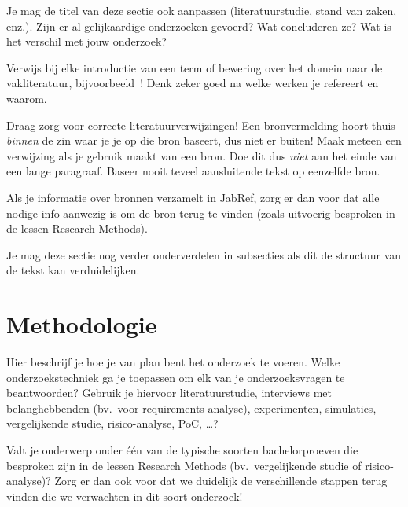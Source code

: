 Je mag de titel van deze sectie ook aanpassen (literatuurstudie, stand van zaken, enz.). Zijn er al gelijkaardige onderzoeken gevoerd? Wat concluderen ze? Wat is het verschil met jouw onderzoek?

Verwijs bij elke introductie van een term of bewering over het domein naar de vakliteratuur, bijvoorbeeld~\autocite{Hykes2013}! Denk zeker goed na welke werken je refereert en waarom.

Draag zorg voor correcte literatuurverwijzingen! Een bronvermelding hoort thuis \emph{binnen} de zin waar je je op die bron baseert, dus niet er buiten! Maak meteen een verwijzing als je gebruik maakt van een bron. Doe dit dus \emph{niet} aan het einde van een lange paragraaf. Baseer nooit teveel aansluitende tekst op eenzelfde bron.

Als je informatie over bronnen verzamelt in JabRef, zorg er dan voor dat alle nodige info aanwezig is om de bron terug te vinden (zoals uitvoerig besproken in de lessen Research Methods).


Je mag deze sectie nog verder onderverdelen in subsecties als dit de structuur van de tekst kan verduidelijken.

\section{Methodologie}%
\label{sec:methodologie}

Hier beschrijf je hoe je van plan bent het onderzoek te voeren. Welke onderzoekstechniek ga je toepassen om elk van je onderzoeksvragen te beantwoorden? Gebruik je hiervoor literatuurstudie, interviews met belanghebbenden (bv.~voor requirements-analyse), experimenten, simulaties, vergelijkende studie, risico-analyse, PoC, \ldots?

Valt je onderwerp onder één van de typische soorten bachelorproeven die besproken zijn in de lessen Research Methods (bv.\ vergelijkende studie of risico-analyse)? Zorg er dan ook voor dat we duidelijk de verschillende stappen terug vinden die we verwachten in dit soort onderzoek!

